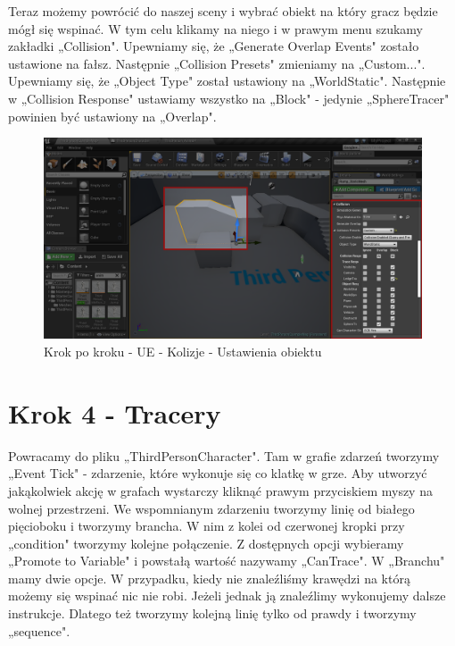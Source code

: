 \documentclass[12pt]{xmgr}
\begin{document}
Teraz możemy powrócić do naszej sceny i wybrać obiekt na który gracz będzie mógł się wspinać. W tym celu klikamy na niego i w prawym menu szukamy zakładki „Collision". Upewniamy się, że „Generate Overlap Events" zostało ustawione na fałsz. Następnie „Collision Presets" zmieniamy na „Custom...". Upewniamy się, że „Object Type" został ustawiony na „WorldStatic". Następnie w „Collision Response" ustawiamy wszystko na „Block" - jedynie „SphereTracer" powinien być ustawiony na „Overlap".

\begin{figure}[!htb]
    \begin{center}
    \includegraphics[scale=0.35]{Screeny/UeKrokPoKroku/UE-Climb-ObjectCollision}
    \end{center}
    \caption{Krok po kroku - UE - Kolizje - Ustawienia obiektu}
\end{figure}

\section{Krok 4 - Tracery}

Powracamy do pliku „ThirdPersonCharacter". Tam w grafie zdarzeń tworzymy „Event Tick" - zdarzenie, które wykonuje się co klatkę w grze. Aby utworzyć jakąkolwiek akcję w grafach wystarczy kliknąć prawym przyciskiem myszy na wolnej przestrzeni. We wspomnianym zdarzeniu tworzymy linię od białego pięcioboku i tworzymy brancha. W nim z kolei od czerwonej kropki przy „condition" tworzymy kolejne połączenie. Z dostępnych opcji wybieramy „Promote to Variable" i powstałą wartość nazywamy „CanTrace".
W „Branchu" mamy dwie opcje. W przypadku, kiedy nie znaleźliśmy krawędzi na którą możemy się wspinać nic nie robi. Jeżeli jednak ją znaleźlimy wykonujemy dalsze instrukcje. Dlatego też tworzymy kolejną linię tylko od prawdy i tworzymy „sequence".
\end{document}
